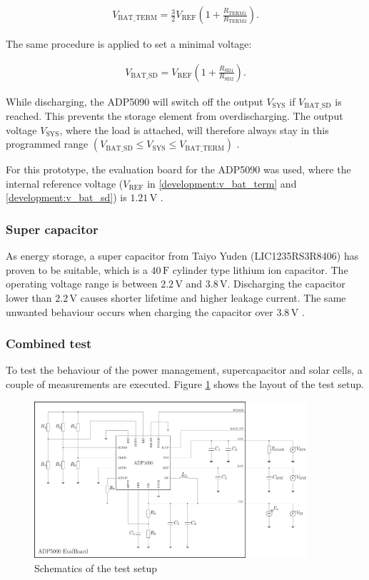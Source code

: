 \begin{align}
	V_{\text{BAT\_TERM}} = \frac{3}{2} V_{\text{REF}}\left(1+\frac{R_{\text{TERM1}}}{R_{\text{TERM2}}} \right).\label{development:v_bat_term} 
\end{align} 

The same procedure is applied to set a minimal voltage:

\begin{align}
	V_{\text{BAT\_SD}}=V_{\text{REF}} \left(1+\frac{R_{\text{SD1}}}{R_{\text{SD2}}} \right).\label{development:v_bat_sd} 
\end{align}  

While discharging, the ADP5090 will switch off the output $V_{\text{SYS}}$ if $V_{\text{BAT\_SD}}$ is reached. This prevents the storage element from overdischarging.
The output voltage $V_{\text{SYS}}$, where the load is attached, will therefore always stay in this programmed range $(V_{\text{BAT\_SD}}\le V_{\text{SYS}}\le V_{\text{BAT\_TERM}})$ \cite{adp}.

For this prototype, the evaluation board for the ADP5090 was used, where the internal reference voltage ($V_{\text{REF}}$ in \eqref{development:v_bat_term} and \eqref{development:v_bat_sd}) is $1.21\,\text{V}$ \cite{adp_eval}.

\subsubsection{Super capacitor}
As energy storage, a super capacitor from Taiyo Yuden (LIC1235RS3R8406) has proven to be suitable, which is a $40\,\text{F}$ cylinder type lithium ion capacitor.
The operating voltage range is between $2.2\,\text{V}$ and $3.8\,\text{V}$.
Discharging the capacitor lower than $2.2\,\text{V}$ causes shorter lifetime and higher leakage current.
The same unwanted behaviour occurs when charging the capacitor over $3.8\,\text{V}$ \cites{yuden}.

\subsubsection{Combined test}
To test the behaviour of the power management, supercapacitor and solar cells, a couple of measurements are executed.
Figure \ref{development:test} shows the layout of the test setup.

\begin{figure}[ht]
	\centering
	\includegraphics[width=0.9\textwidth]{4-development/hardware/graphics/testaufbau.pdf}
	\caption{Schematics of the test setup\label{development:test}}
\end{figure}

